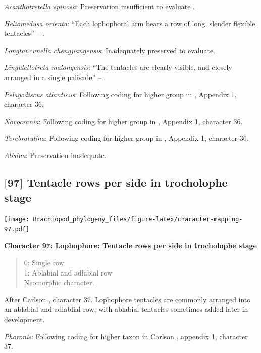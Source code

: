 \documentclass[openany]{book}
\theoremstyle{definition}
\theoremstyle{definition}
\theoremstyle{definition}
\theoremstyle{remark}
\begin{document}
\emph{Acanthotretella spinosa}: Preservation insufficient to evaluate
\citep{Holmer2006Aspinose}.

\emph{Heliomedusa orienta}: ``Each lophophoral arm bears a row of long,
slender flexible tentacles'' -- \citet{Zhang2009Architectureand}.

\emph{Longtancunella chengjiangensis}: Inadequately preserved to
evaluate.

\emph{Lingulellotreta malongensis}: ``The tentacles are clearly visible,
and closely arranged in a single palisade'' -- \citet{Zhang2004Newdata}.

\emph{Pelagodiscus atlanticus}: Following coding for higher group in
\citet{Carlson1995Phylogeneticrelationships}, Appendix 1, character 36.

\emph{Novocrania}: Following coding for higher group in
\citet{Carlson1995Phylogeneticrelationships}, Appendix 1, character 36.

\emph{Terebratulina}: Following coding for higher group in
\citet{Carlson1995Phylogeneticrelationships}, Appendix 1, character 36.

\emph{Alisina}: Preservation inadequate.

\hypertarget{tentacle-rows-per-side-in-trocholophe-stage}{%
\subsection*{{[}97{]} Tentacle rows per side in trocholophe
stage}\label{tentacle-rows-per-side-in-trocholophe-stage}}

\texttt{[image: Brachiopod\_phylogeny\_files/figure-latex/character-mapping-97.pdf]}

\textbf{Character 97: Lophophore: Tentacle rows per side in trocholophe
stage}

\begin{quote}
0: Single row\\
1: Ablabial and adlabial row\\
Neomorphic character.
\end{quote}

After Carlson \citeyearpar{Carlson1995Phylogeneticrelationships},
character 37. Lophophore tentacles are commonly arranged into an
ablabial and adlablial row, with ablabial tentacles sometimes added
later in development.

\emph{Phoronis}: Following coding for higher taxon in Carlson
\citeyearpar{Carlson1995Phylogeneticrelationships}, appendix 1,
character 37.
\end{document}

